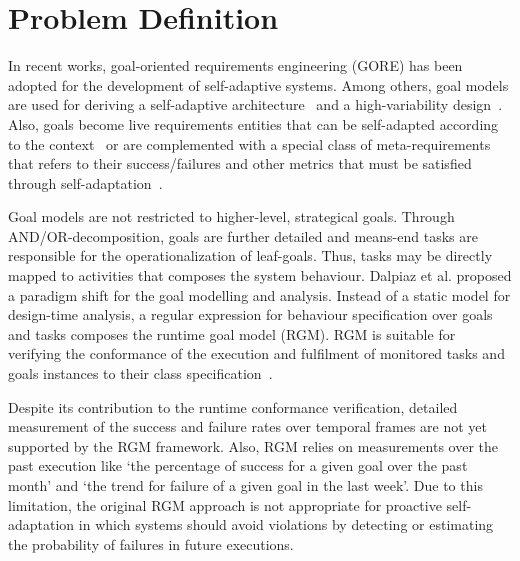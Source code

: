 
\section{Problem Definition}


In recent works, goal-oriented requirements engineering (GORE) has been adopted for the development of self-adaptive systems. Among others, goal models are used for deriving a self-adaptive architecture~\cite{Tang:2009} and a high-variability design~\cite{Yu:2008}. Also, goals become live requirements entities that can be self-adapted according to the context~\cite{Baresi:2010:1,Baresi:2010:2} or are complemented with a special class of meta-requirements that refers to their success/failures and other metrics that must be satisfied through self-adaptation~\cite{Souza:2011}. 

Goal models are not restricted to higher-level, strategical goals. Through AND/OR-decomposition, goals are further detailed and means-end tasks are responsible for the operationalization of leaf-goals. Thus, tasks may be directly mapped to activities that composes the system behaviour. Dalpiaz et al. proposed a paradigm shift for the goal modelling and analysis. Instead of a static model for design-time analysis, a regular expression for behaviour specification over goals and tasks composes the runtime goal model (RGM). RGM is suitable for verifying the conformance of the execution and fulfilment of monitored tasks and goals instances to their class specification~\cite{Dalpiaz:2013}.

Despite its contribution to the runtime conformance verification, detailed measurement of the success and failure rates over temporal frames are not yet supported by the RGM framework. Also, RGM relies on measurements over the past execution like `the percentage of success for a given goal over the past month' and `the trend for failure of a given goal in the last week'. Due to this limitation, the original RGM approach is not appropriate for proactive self-adaptation in which systems should avoid violations by detecting or estimating the probability of failures in future executions.

